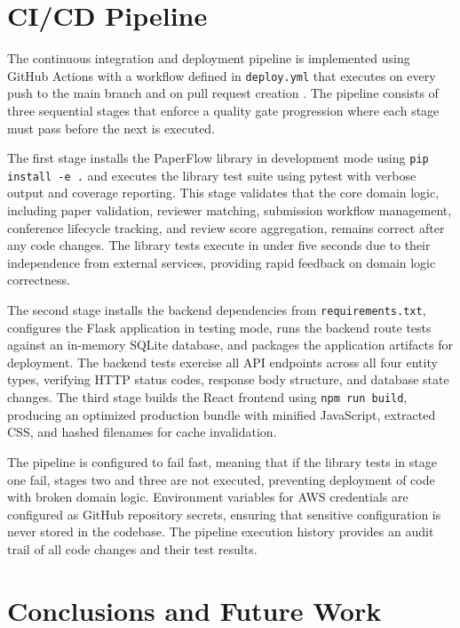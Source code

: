 \documentclass[conference]{IEEEtran}
\begin{document}
\section{CI/CD Pipeline}

The continuous integration and deployment pipeline is implemented using GitHub Actions with a workflow defined in \texttt{deploy.yml} that executes on every push to the main branch and on pull request creation \cite{ghactions2024}. The pipeline consists of three sequential stages that enforce a quality gate progression where each stage must pass before the next is executed.

The first stage installs the PaperFlow library in development mode using \texttt{pip install -e .} and executes the library test suite using pytest with verbose output and coverage reporting. This stage validates that the core domain logic, including paper validation, reviewer matching, submission workflow management, conference lifecycle tracking, and review score aggregation, remains correct after any code changes. The library tests execute in under five seconds due to their independence from external services, providing rapid feedback on domain logic correctness.

The second stage installs the backend dependencies from \texttt{requirements.txt}, configures the Flask application in testing mode, runs the backend route tests against an in-memory SQLite database, and packages the application artifacts for deployment. The backend tests exercise all API endpoints across all four entity types, verifying HTTP status codes, response body structure, and database state changes. The third stage builds the React frontend using \texttt{npm run build}, producing an optimized production bundle with minified JavaScript, extracted CSS, and hashed filenames for cache invalidation.

The pipeline is configured to fail fast, meaning that if the library tests in stage one fail, stages two and three are not executed, preventing deployment of code with broken domain logic. Environment variables for AWS credentials are configured as GitHub repository secrets, ensuring that sensitive configuration is never stored in the codebase. The pipeline execution history provides an audit trail of all code changes and their test results.

\section{Conclusions and Future Work}
\end{document}
